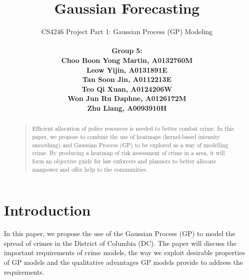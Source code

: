 \documentclass[letterpaper]{article}
\begin{document}
	\title{Gaussian Forecasting}
	\author{CS4246 Project Part 1: Gaussian Process (GP) Modeling  \\ \\
		\bf \small Group 5:\\
	\small Choo Boon Yong Martin, A0132760M\\
	\small Leow Yijin, A0131891E\\
	\small Tan Soon Jin, A0112213E\\
	\small Teo Qi Xuan, A0124206W\\
	\small Won Jun Ru Daphne, A0126172M\\
	\small Zhu Liang, A0093910H\\
	}	
	
	
	\maketitle
	\thispagestyle{empty}
	\pagestyle{empty}
	
	
	
	\begin{abstract}
	\begin{quote}
		Efficient allocation of police resources is needed to better combat crime. In this paper, we propose to combine the use of heatmaps (kernel-based intensity smoothing) and Gaussian Process (GP) to be explored as a way of modelling crime. By producing a heatmap of risk assessment of crime in a area, it will form an objective guide for law enforcers and planners to better allocate manpower and offer help to the communities.
	\end{quote}
	\end{abstract}
	
	
	\section{Introduction}
	
	In this paper, we propose the use of the Gaussian Process (GP) to model the spread of crimes in the District of Columbia (DC).
	The paper will discuss the important requirements of crime models, the way we exploit desirable properties of GP models and the qualitative advantages GP models provide to address the requirements.\\ \\
\end{document}
